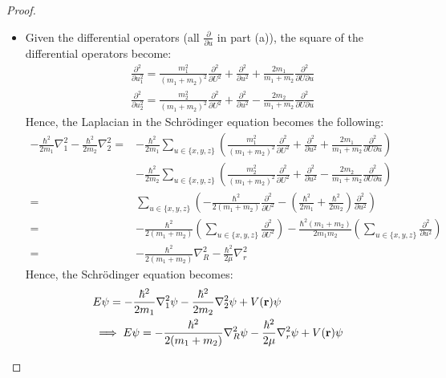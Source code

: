 \documentclass{article}
\begin{document}
\begin{proof}
\begin{itemize}
        \item[(b)]
        Given the differential operators (all $\frac{\partial}{\partial u}$ in part (a)), the square of the differential operators become:
        \begin{align}
            &\frac{\partial^2}{\partial u_1^2} = \frac{m_1^2}{(m_1+m_2)^2}\frac{\partial^2}{\partial U^2} + \frac{\partial^2}{\partial u^2} + \frac{2m_1}{m_1+m_2}\frac{\partial^2}{\partial U\partial u}\\
            &\frac{\partial^2}{\partial u_2^2} = \frac{m_2^2}{(m_1+m_2)^2}\frac{\partial^2}{\partial U^2} + \frac{\partial^2}{\partial u^2} - \frac{2m_2}{m_1+m_2}\frac{\partial^2}{\partial U\partial u}
        \end{align}
        Hence, the Laplacian in the Schr\"odinger equation becomes the following:
        \begin{align}
            -\frac{\hbar^2}{2m_1}\nabla_1^2 -\frac{\hbar^2}{2m_2}\nabla_2^2 =& -\frac{\hbar^2}{2m_1}\sum_{u\in\{x,y,z\}}\left(\frac{m_1^2}{(m_1+m_2)^2}\frac{\partial^2}{\partial U^2}+\frac{\partial^2}{\partial u^2}+\frac{2m_1}{m_1+m_2}\frac{\partial^2}{\partial U\partial u}\right)\\
            &-\frac{\hbar^2}{2m_2}\sum_{u\in\{x,y,z\}}\left(\frac{m_2^2}{(m_1+m_2)^2}\frac{\partial^2}{\partial U^2}+\frac{\partial^2}{\partial u^2}-\frac{2m_2}{m_1+m_2}\frac{\partial^2}{\partial U\partial u}\right)\\
            =&\sum_{u\in\{x,y,z\}}\left(-\frac{\hbar^2}{2(m_1+m_2)}\frac{\partial^2}{\partial U^2} - \left(\frac{\hbar^2}{2m_1}+\frac{\hbar^2}{2m_2}\right)\frac{\partial^2}{\partial u^2}\right)\\
            =& -\frac{\hbar^2}{2(m_1+m_2)}\left(\sum_{u\in\{x,y,z\}}\frac{\partial^2}{\partial U^2}\right) - \frac{\hbar^2(m_1+m_2)}{2m_1m_2}\left(\sum_{u\in\{x,y,z\}}\frac{\partial^2}{\partial u^2}\right)\\
            =& - \frac{\hbar^2}{2(m_1+m_2)}\nabla_R^2 - \frac{\hbar^2}{2\mu}\nabla_r^2
        \end{align}
        Hence, the Schr\"odinger equation becomes:
        \begin{align}
            &E\psi = -\frac{\hbar^2}{2m_1}\nabla_1^2\psi - \frac{\hbar^2}{2m_2}\nabla_2^2\psi + V(\mathbf{r})\psi\\
            &\implies E\psi = -\frac{\hbar^2}{2(m_1+m_2)}\nabla_R^2\psi - \frac{\hbar^2}{2\mu}\nabla_r^2\psi + V(\mathbf{r})\psi
        \end{align}


\end{itemize}
\end{proof}
\end{document}

